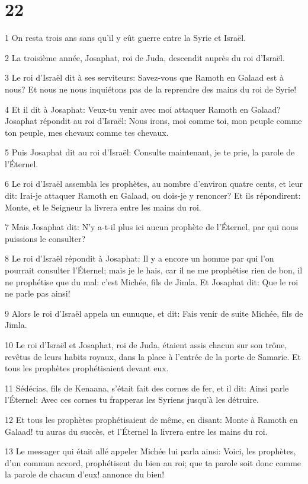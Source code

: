 \chapter{22}

\par 1 On resta trois ans sans qu'il y eût guerre entre la Syrie et Israël.
\par 2 La troisième année, Josaphat, roi de Juda, descendit auprès du roi d'Israël.
\par 3 Le roi d'Israël dit à ses serviteurs: Savez-vous que Ramoth en Galaad est à nous? Et nous ne nous inquiétons pas de la reprendre des mains du roi de Syrie!
\par 4 Et il dit à Josaphat: Veux-tu venir avec moi attaquer Ramoth en Galaad? Josaphat répondit au roi d'Israël: Nous irons, moi comme toi, mon peuple comme ton peuple, mes chevaux comme tes chevaux.
\par 5 Puis Josaphat dit au roi d'Israël: Consulte maintenant, je te prie, la parole de l'Éternel.
\par 6 Le roi d'Israël assembla les prophètes, au nombre d'environ quatre cents, et leur dit: Irai-je attaquer Ramoth en Galaad, ou dois-je y renoncer? Et ils répondirent: Monte, et le Seigneur la livrera entre les mains du roi.
\par 7 Mais Josaphat dit: N'y a-t-il plus ici aucun prophète de l'Éternel, par qui nous puissions le consulter?
\par 8 Le roi d'Israël répondit à Josaphat: Il y a encore un homme par qui l'on pourrait consulter l'Éternel; mais je le hais, car il ne me prophétise rien de bon, il ne prophétise que du mal: c'est Michée, fils de Jimla. Et Josaphat dit: Que le roi ne parle pas ainsi!
\par 9 Alors le roi d'Israël appela un eunuque, et dit: Fais venir de suite Michée, fils de Jimla.
\par 10 Le roi d'Israël et Josaphat, roi de Juda, étaient assis chacun sur son trône, revêtus de leurs habits royaux, dans la place à l'entrée de la porte de Samarie. Et tous les prophètes prophétisaient devant eux.
\par 11 Sédécias, fils de Kenaana, s'était fait des cornes de fer, et il dit: Ainsi parle l'Éternel: Avec ces cornes tu frapperas les Syriens jusqu'à les détruire.
\par 12 Et tous les prophètes prophétisaient de même, en disant: Monte à Ramoth en Galaad! tu auras du succès, et l'Éternel la livrera entre les mains du roi.
\par 13 Le messager qui était allé appeler Michée lui parla ainsi: Voici, les prophètes, d'un commun accord, prophétisent du bien au roi; que ta parole soit donc comme la parole de chacun d'eux! annonce du bien!
